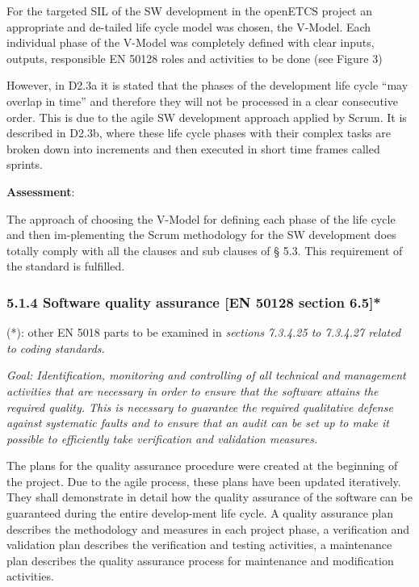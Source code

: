 For the targeted SIL of the SW development in the openETCS project an appropriate and de-tailed life cycle model was chosen, the V-Model. Each individual phase of the V-Model was completely defined with clear inputs, outputs, responsible EN 50128 roles and activities to be done (see Figure 3) 

\bigskip


\bigskip

However, in D2.3a it is stated that the phases of the development life cycle “may overlap in time” and therefore they will not be processed in a clear consecutive order. This is due to the agile SW development approach applied by Scrum. It is described in D2.3b, where these life cycle phases with their complex tasks are broken down into increments and then executed in short time frames called sprints.

\bigskip

\textbf{Assessment}:

The approach of choosing the V-Model for defining each phase of the life cycle and then im-plementing the Scrum methodology for the SW development does totally comply with all the clauses and sub clauses of § 5.3.
This requirement of the standard is fulfilled. 



\subsubsection{5.1.4 Software quality assurance [EN 50128 section 6.5]*}

\tiny{(*): other EN 5018 parts to be examined in \textit{sections 7.3.4.25 to 7.3.4.27 related to coding standards.} }

\textit{Goal: Identification, monitoring and controlling of all technical and management activities that are necessary in order
to ensure that the software attains the required quality. This is necessary to guarantee the required qualitative defense against systematic faults and to ensure that an audit can be set up to make it possible to efficiently take verification and validation measures.}

\bigskip
The plans for the quality assurance procedure were created at the beginning of the project. Due to the agile process, these plans have been updated iteratively. They shall demonstrate in detail how the quality assurance of the software can be guaranteed during the entire develop-ment life cycle. A quality assurance plan describes the methodology and measures in each project phase, a verification and validation plan describes the verification and testing activities, a maintenance plan describes the quality assurance process for maintenance and modification activities.
\bigskip


